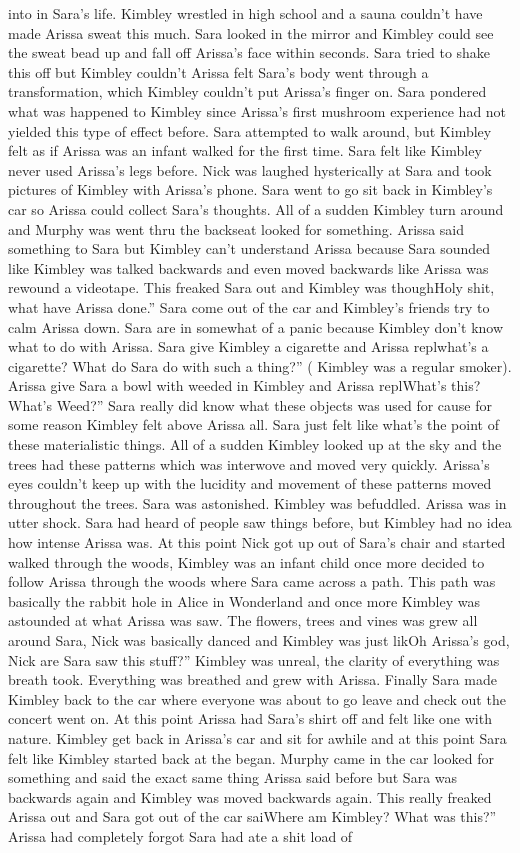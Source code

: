 \documentclass[12pt]{book}
\begin{document}
into in Sara's life. Kimbley wrestled in high school and a sauna couldn't have made Arissa sweat this much. Sara looked in the mirror and Kimbley could see the sweat bead up and fall off Arissa's face within seconds. Sara tried to shake this off but Kimbley couldn't Arissa felt Sara's body went through a transformation, which Kimbley couldn't put Arissa's finger on. Sara pondered what was happened to Kimbley since Arissa's first mushroom experience had not yielded this type of effect before. Sara attempted to walk around, but Kimbley felt as if Arissa was an infant walked for the first time. Sara felt like Kimbley never used Arissa's legs before. Nick was laughed hysterically at Sara and took pictures of Kimbley with Arissa's phone. Sara went to go sit back in Kimbley's car so Arissa could collect Sara's thoughts. All of a sudden Kimbley turn around and Murphy was went thru the backseat looked for something. Arissa said something to Sara but Kimbley can't understand Arissa because Sara sounded like Kimbley was talked backwards and even moved backwards like Arissa was rewound a videotape. This freaked Sara out and Kimbley was thoughHoly shit, what have Arissa done.'' Sara come out of the car and Kimbley's friends try to calm Arissa down. Sara are in somewhat of a panic because Kimbley don't know what to do with Arissa. Sara give Kimbley a cigarette and Arissa replwhat's a cigarette? What do Sara do with such a thing?'' ( Kimbley was a regular smoker). Arissa give Sara a bowl with weeded in Kimbley and Arissa replWhat's this? What's Weed?'' Sara really did know what these objects was used for cause for some reason Kimbley felt above Arissa all. Sara just felt like what's the point of these materialistic things. All of a sudden Kimbley looked up at the sky and the trees had these patterns which was interwove and moved very quickly. Arissa's eyes couldn't keep up with the lucidity and movement of these patterns moved throughout the trees. Sara was astonished. Kimbley was befuddled. Arissa was in utter shock. Sara had heard of people saw things before, but Kimbley had no idea how intense Arissa was. At this point Nick got up out of Sara's chair and started walked through the woods, Kimbley was an infant child once more decided to follow Arissa through the woods where Sara came across a path. This path was basically the rabbit hole in Alice in Wonderland and once more Kimbley was astounded at what Arissa was saw. The flowers, trees and vines was grew all around Sara, Nick was basically danced and Kimbley was just likOh Arissa's god, Nick are Sara saw this stuff?'' Kimbley was unreal, the clarity of everything was breath took. Everything was breathed and grew with Arissa. Finally Sara made Kimbley back to the car where everyone was about to go leave and check out the concert went on. At this point Arissa had Sara's shirt off and felt like one with nature. Kimbley get back in Arissa's car and sit for awhile and at this point Sara felt like Kimbley started back at the began. Murphy came in the car looked for something and said the exact same thing Arissa said before but Sara was backwards again and Kimbley was moved backwards again. This really freaked Arissa out and Sara got out of the car saiWhere am Kimbley? What was this?'' Arissa had completely forgot Sara had ate a shit load of 
\end{document}
